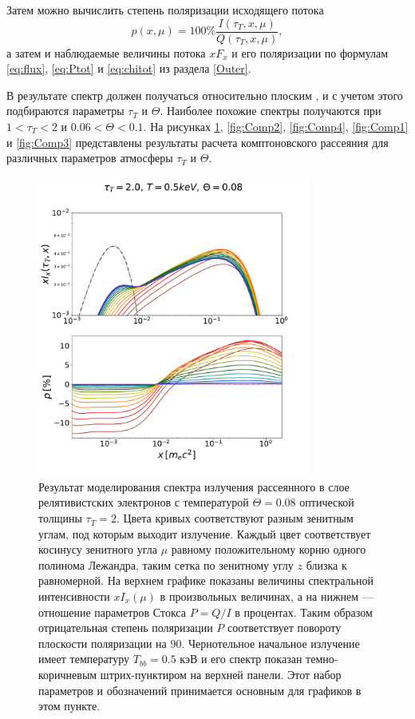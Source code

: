 \documentclass[14pt,a4paper]{extarticle}
\newcommand{\be}{\begin{equation}}
\newcommand{\ee}{\end{equation}}
\begin{document}
			Затем можно вычислить степень поляризации исходящего потока   
			\be
			p(x,\mu)=100\%\frac{I(\tau_T,x,\mu)}{Q(\tau_T,x,\mu)},
			\ee
			а затем и наблюдаемые величины потока  $xF_x$ и его поляризации по формулам 
			\eqref{eq:flux},
			\eqref{eq:Ptot} и \eqref{eq:chitot} 
			из раздела \ref{Outer}.

			В результате спектр должен получаться относительно плоским \cite{Poutanen2003,Poutanen2008},  и с учетом этого подбираются параметры  $\tau_T$ и $\Theta$. 
			Наиболее похожие спектры получаются при $1<\tau_T<2$ и $0.06<\Theta<0.1$.
			На рисунках \ref{fig:Comp0},
			\ref{fig:Comp2}, \ref{fig:Comp4},
			\ref{fig:Comp1}
			и \ref{fig:Comp3} представлены результаты расчета комптоновского рассеяния для различных параметров атмосферы $\tau_T$ и $\Theta$. 

			\newpage
			\begin{figure}[H]
				\centering
				\includegraphics[width=0.8\textwidth]{CM2zAll.pdf}
				\caption{\small
					Результат моделирования спектра излучения рассеянного в слое
					 релятивистских электронов с температурой $\Theta=0.08$
					 оптической толщины $\tau_T=2$. 
					Цвета кривых соответствуют разным зенитным углам, под которым выходит излучение. 
					Каждый цвет соответствует косинусу зенитного угла $\mu$ равному положительному корню одного полинома Лежандра, таким сетка по зенитному углу $z$ близка к равномерной. 
					На верхнем графике показаны величины спектральной интенсивности $xI_x(\mu)$ в произвольных величинах, а на нижнем --- отношение параметров Стокса $P=Q/I$ в процентах. 
					Таким образом отрицательная степень поляризации $P$ соответствует повороту плоскости поляризации на 90\degree.
					Чернотельное начальное излучение имеет температуру $T_{bb}=0.5$ кэВ и его спектр показан темно-коричневым штрих-пунктиром на верхней панели.
					Этот набор параметров и обозначений принимается основным для графиков в этом пункте. 
				}\label{fig:Comp0}
			\end{figure}
\end{document}
